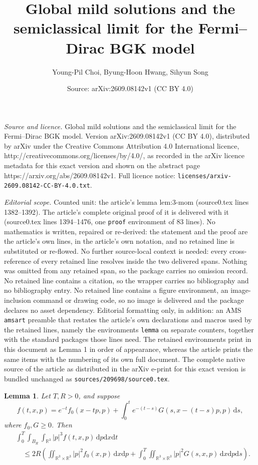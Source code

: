 \documentclass[10pt,a4paper]{amsart}
\title{Global mild solutions and the semiclassical limit for the Fermi--Dirac BGK model}
\author{Young-Pil Choi, Byung-Hoon Hwang, Sihyun Song}
\date{Source: arXiv:2609.08142v1 (CC BY 4.0)}
\newtheorem{lemma}{Lemma}
\newcommand{\R}{\mathbb R}
\newcommand{\dpp}{\mathrm{d}p}
\newcommand{\ds}{\mathrm{d}s}
\newcommand{\dt}{\mathrm{d}t}
\newcommand{\dx}{\mathrm{d}x}
\newcommand{\lt}{\left}
\newcommand{\rt}{\right}
\begin{document}
\maketitle

\noindent\emph{Source and licence.} Global mild solutions and the semiclassical limit for the Fermi--Dirac BGK model. Version arXiv:2609.08142v1 (CC BY 4.0), distributed by arXiv under the Creative Commons Attribution 4.0 International licence, http://creativecommons.org/licenses/by/4.0/, as recorded in the arXiv licence metadata for this exact version and shown on the abstract page https://arxiv.org/abs/2609.08142v1. Full licence notice: \texttt{licenses/arxiv-2609.08142-CC-BY-4.0.txt}.\par\smallskip

\noindent\textit{Editorial scope.} Counted unit: the article's lemma lem:3-mom (source0.tex lines 1382--1392). The article's complete original proof of it is delivered with it (source0.tex lines 1394--1476, one \texttt{proof} environment of 83 lines). No mathematics is written, repaired or re-derived: the statement and the proof are the article's own lines, in the article's own notation, and no retained line is substituted or re-flowed.  No further source-local context is needed: every cross-reference of every retained line resolves inside the two delivered spans.  Nothing was omitted from any retained span, so the package carries no omission record.  No retained line contains a citation, so the wrapper carries no bibliography and no bibliography entry.  No retained line contains a figure environment, an image-inclusion command or drawing code, so no image is delivered and the package declares no asset dependency.  Editorial formatting only, in addition: an AMS \texttt{amsart} preamble that restates the article's own declarations and macros used by the retained lines, namely the environments \texttt{lemma} on separate counters, together with the standard packages those lines need.  The retained environments print in this document as Lemma 1 in order of appearance, whereas the article prints the same items with the numbering of its own full document.  The complete native source of the article as distributed in the arXiv e-print for this exact version is bundled unchanged as \texttt{sources/209698/source0.tex}.
\begin{lemma}\label{lem:3-mom}
Let $T,R>0$, and suppose
\[
 f(t,x,p)  =e^{-t}f_0(x-tp,p) +\int_0^te^{-(t-s)}G(s,x-(t-s)p,p)\,\ds,
\]
where $f_0,G\geq0$.  Then
\begin{align*}
 &\int_0^T\int_{B_R}\int_{\R^3}|p|^3f(t,x,p)\,\dpp\dx\dt \\
 &\quad\leq 2R\lt(  \iint_{\R^3\times\R^3}|p|^2f_0(x,p)\,\dx\dpp  +\int_0^T\iint_{\R^3\times\R^3}|p|^2G(s,x,p)\,\dx\dpp\ds  \rt).
\end{align*}
\end{lemma}
\end{document}
